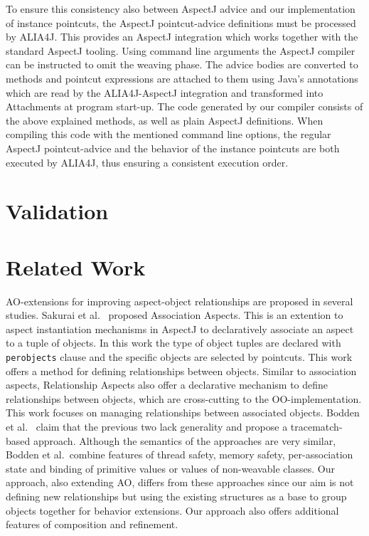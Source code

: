 \documentclass{acm_proc_article-sp}
\newcommand{\lstinln}[1]{\lstinline~#1~}
\begin{document}
To ensure this consistency also between AspectJ advice and our implementation of instance pointcuts, the AspectJ point\-cut-advice definitions must be processed by ALIA4J.
This provides an AspectJ integration which works together with the standard AspectJ tooling.
Using command line arguments the AspectJ compiler can be instructed to omit the weaving phase.
The advice bodies are converted to methods and pointcut expressions are attached to them using Java's annotations which are read by the ALIA4J-AspectJ integration and transformed into Attachments at program start-up.
The code generated by our compiler consists of the above explained methods, as well as plain AspectJ definitions.
When compiling this code with the mentioned command line options, the regular AspectJ pointcut-advice and the behavior of the instance pointcuts are both executed by ALIA4J, thus ensuring a consistent execution order.


\section{Validation}








\section{Related Work}
AO-extensions for improving aspect-object relationships are proposed in several studies. Sakurai et al.~\cite{sakurai2004association} proposed Association Aspects. This is an extention to aspect instantiation mechanisms in AspectJ to declaratively associate an aspect to a tuple of objects. In this work the type of object tuples are declared with \lstinln{perobjects} clause and the specific objects are selected by pointcuts. This work offers a method for defining relationships between objects. Similar to association aspects, Relationship Aspects \cite{pearce2006relationship} also offer a declarative mechanism to define relationships between objects, which are cross-cutting to the OO-implementation. This work focuses on managing relationships between associated objects. Bodden et al.~ \cite{bodden2008relational} claim that the previous two lack generality and propose a tracematch-based approach. Although the semantics of the approaches are very similar, Bodden et al.\ combine features of thread safety, memory safety, per-association state and binding of primitive values or values of non-weavable classes. Our approach, also extending AO, differs from these approaches since our aim is not defining new relationships but using the existing structures as a base to group objects together for behavior extensions. Our approach also offers additional features of composition and refinement.
\end{document}
